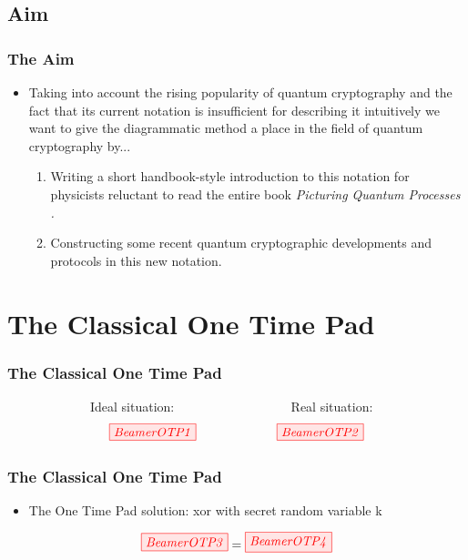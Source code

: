 \documentclass[]{beamer}
\begin{document}
\subsection{Aim}

\begin{frame}
	\frametitle{The Aim}
	\begin{itemize}
		\item Taking into account the rising popularity of quantum cryptography and the fact that its current notation is insufficient for describing it intuitively we want to give the diagrammatic method a place in the field of quantum cryptography by...
		\vspace{0.6cm}
		\begin{enumerate}
			\item Writing a short handbook-style introduction to this notation for physicists reluctant to read the entire book \textit{Picturing Quantum Processes \cite{Coecke2017}.}
			\vspace{0.6cm}
			\item Constructing some recent quantum cryptographic developments and protocols in this new notation.
		\end{enumerate}
	\end{itemize}
\end{frame}

\section{The Classical One Time Pad}
\begin{frame}
	\centering 
	\Huge
\end{frame}
\begin{frame}
	\frametitle{The Classical One Time Pad}
	~~~~~~~~~~~~~Ideal situation:  ~~~~~~~~~~~~~~~~~ Real situation:
	\begin{equation}
	\tikzfig{BeamerOTP1} ~~~~~~~~~~~~~~~~~~~ \tikzfig{BeamerOTP2}
 	\end{equation}
\end{frame}

\begin{frame}
	\frametitle{The Classical One Time Pad}
	\begin{itemize}
	\item The One Time Pad solution: xor with secret random variable k
	\vspace{0.5cm}
	\end{itemize}
\begin{equation}
	\tikzfig{BeamerOTP3} = \tikzfig{BeamerOTP4} %
\end{equation}
\end{frame}
\end{document}
